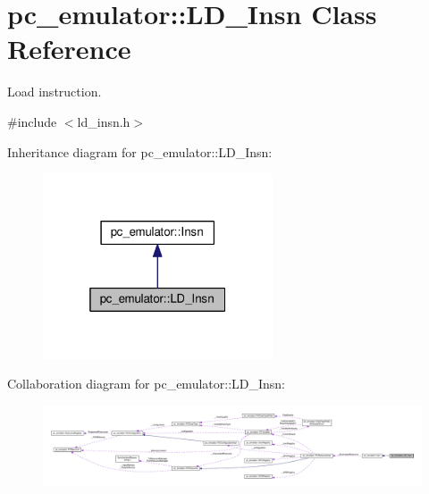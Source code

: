 \hypertarget{classpc__emulator_1_1LD__Insn}{}\section{pc\+\_\+emulator\+:\+:L\+D\+\_\+\+Insn Class Reference}
\label{classpc__emulator_1_1LD__Insn}


Load instruction.  




{\ttfamily \#include $<$ld\+\_\+insn.\+h$>$}



Inheritance diagram for pc\+\_\+emulator\+:\+:L\+D\+\_\+\+Insn\+:\nopagebreak
\begin{figure}[H]
\begin{center}
\leavevmode
\includegraphics[width=193pt]{classpc__emulator_1_1LD__Insn__inherit__graph}
\end{center}
\end{figure}


Collaboration diagram for pc\+\_\+emulator\+:\+:L\+D\+\_\+\+Insn\+:\nopagebreak
\begin{figure}[H]
\begin{center}
\leavevmode
\includegraphics[width=350pt]{classpc__emulator_1_1LD__Insn__coll__graph}
\end{center}
\end{figure}
